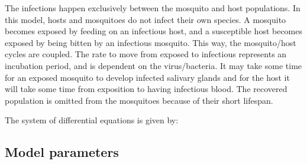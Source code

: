 \documentclass{article}
\begin{document}
The infections happen exclusively between the mosquito and host populations. In this model, hosts and mosquitoes do not infect their own species. A mosquito becomes exposed by feeding on an infectious host, and a susceptible host becomes exposed by being bitten by an infectious mosquito. This way, the mosquito/host cycles are coupled. The rate to move from exposed to infectious represents an incubation period, and is dependent on the virus/bacteria. It may take some time for an exposed mosquito to develop infected salivary glands and for the host it will take some time from exposition to having infectious blood. The recovered population is omitted from the mosquitoes because of their short lifespan.

The system of differential equations is given by:




\subsection{Model parameters}
\end{document}
